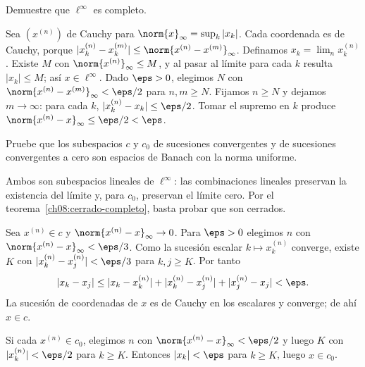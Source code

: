 \begin{ejercicio}\label{ej:lectura-8-3}
Demuestre que $\ell^\infty$ es completo.
\end{ejercicio}
\begin{solucion}
Sea $(x^{(n)})$ de Cauchy para $\norm{x}_\infty=\sup_k|x_k|$. Cada coordenada es de Cauchy, porque $|x^{(n)}_k-x^{(m)}_k|\leq\norm{x^{(n)}-x^{(m)}}_\infty$. Definamos $x_k=\lim_nx^{(n)}_k$. Existe $M$ con $\norm{x^{(n)}}_\infty\leq M$, y al pasar al límite para cada $k$ resulta $|x_k|\leq M$; así $x\in\ell^\infty$. Dado $\eps>0$, elegimos $N$ con $\norm{x^{(n)}-x^{(m)}}_\infty<\eps/2$ para $n,m\geq N$. Fijamos $n\geq N$ y dejamos $m\to\infty$: para cada $k$, $|x^{(n)}_k-x_k|\leq\eps/2$. Tomar el supremo en $k$ produce $\norm{x^{(n)}-x}_\infty\leq\eps/2<\eps$.
\end{solucion}

\begin{ejercicio}\label{ej:lectura-8-4}
Pruebe que los subespacios $c$ y $c_0$ de sucesiones convergentes y de sucesiones convergentes a cero son espacios de Banach con la norma uniforme.
\end{ejercicio}
\begin{solucion}
Ambos son subespacios lineales de $\ell^\infty$: las combinaciones lineales preservan la existencia del límite y, para $c_0$, preservan el límite cero. Por el teorema~\ref{ch08:cerrado-completo}, basta probar que son cerrados.

Sea $x^{(n)}\in c$ y $\norm{x^{(n)}-x}_\infty\to0$. Para $\eps>0$ elegimos $n$ con $\norm{x^{(n)}-x}_\infty<\eps/3$. Como la sucesión escalar $k\mapsto x^{(n)}_k$ converge, existe $K$ con $|x^{(n)}_k-x^{(n)}_j|<\eps/3$ para $k,j\geq K$. Por tanto
\[
 |x_k-x_j|\leq|x_k-x^{(n)}_k|+|x^{(n)}_k-x^{(n)}_j|+|x^{(n)}_j-x_j|<\eps.
\]
La sucesión de coordenadas de $x$ es de Cauchy en los escalares y converge; de ahí $x\in c$.

Si cada $x^{(n)}\in c_0$, elegimos $n$ con $\norm{x^{(n)}-x}_\infty<\eps/2$ y luego $K$ con $|x^{(n)}_k|<\eps/2$ para $k\geq K$. Entonces $|x_k|<\eps$ para $k\geq K$, luego $x\in c_0$.
\end{solucion}

